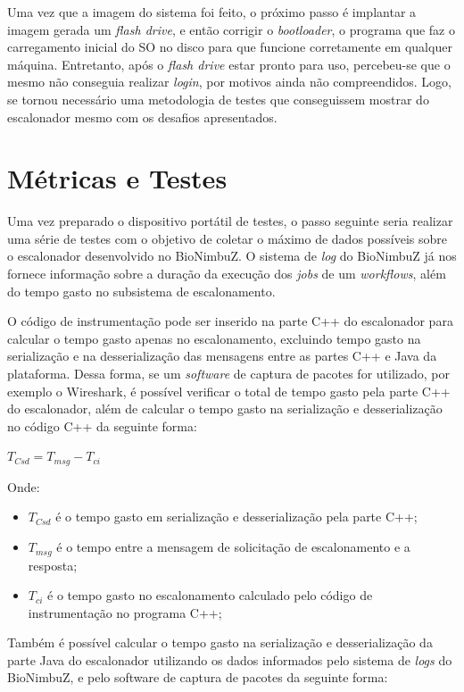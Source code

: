Uma vez que a imagem do sistema foi feito, o próximo passo é implantar a imagem gerada um \textit{flash drive}, e então corrigir o \textit{bootloader}, o programa que faz o carregamento inicial do \acrshort{SO} no disco para que funcione corretamente em qualquer máquina. Entretanto, após o \textit{flash drive} estar pronto para uso, percebeu-se que o mesmo não conseguia realizar \textit{login}, por motivos ainda não compreendidos. Logo, se tornou necessário uma metodologia de testes que conseguissem mostrar do escalonador mesmo com os desafios apresentados.

\section{Métricas e Testes}

Uma vez preparado o dispositivo portátil de testes, o passo seguinte seria realizar uma série de testes com o objetivo de coletar o máximo de dados possíveis sobre o escalonador desenvolvido no BioNimbuZ. O sistema de \textit{log} do BioNimbuZ já nos fornece informação sobre a duração da execução dos \textit{jobs} de um \textit{workflows}, além do tempo gasto no subsistema de escalonamento. 

O código de instrumentação pode ser inserido na parte C++ do escalonador para calcular o tempo gasto apenas no escalonamento, excluindo tempo gasto na serialização e na desserialização das mensagens entre as partes C++ e Java da plataforma. Dessa forma, se um \textit{software} de captura de pacotes for utilizado, por exemplo o Wireshark\cite{Wireshark}, é possível verificar o total de tempo gasto pela parte C++ do escalonador, além de calcular o tempo gasto na serialização e desserialização no código C++ da seguinte forma:

\centerline{ $T_{Csd} = T_{msg} - T_{ci}$ }

Onde: 
 \begin{itemize}
 	\item $T_{Csd}$ é o tempo gasto em serialização e desserialização pela parte C++;
 	\item $T_{msg}$ é o tempo entre a mensagem de solicitação de escalonamento e a resposta;
 	\item $T_{ci}$ é o tempo gasto no escalonamento calculado pelo código de instrumentação no programa C++;
 \end{itemize}

Também é possível calcular o tempo gasto na serialização e desserialização da parte Java do escalonador utilizando os dados informados pelo sistema de \textit{logs} do BioNimbuZ, e pelo software de captura de pacotes da seguinte forma:

